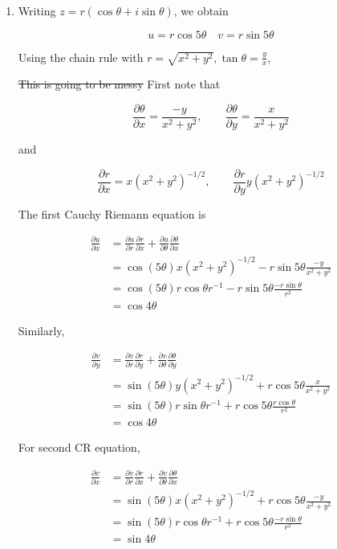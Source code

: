 \documentclass[a4paper]{article}
\begin{document}
\begin{enumerate}
	
	\item Writing $ z= r(\cos \theta + i \sin \theta) $, we obtain 
	
	\[ u = r\cos 5 \theta \quad v = r\sin 5\theta \]
	
	Using the chain rule with $ r = \sqrt{x^{2} + y^{2}}, \tan \theta = \frac{y}{x} $,
	
	\st{This is going to be messy} First note that
	
	\[ \frac{\partial \theta }{\partial x} = \frac{-y}{x^{2} + y^{2}}, \qquad \frac{\partial \theta }{\partial y} = \frac{x}{x^{2} + y^{2}} \]
	
	and
	
	\[ \frac{\partial r }{\partial x} = x (x^{2} + y^{2})^{-1/2}, \qquad \frac{\partial r }{\partial y} y (x^{2} + y^{2})^{-1/2} \]
	
	The first Cauchy Riemann equation is
	
	\begin{align*}
	\frac{\partial u }{\partial x} & = \frac{\partial u }{\partial r} \frac{\partial r}{\partial x} + \frac{\partial u }{\partial \theta} \frac{\partial \theta}{\partial x} \\
	& = \cos (5 \theta) x (x^{2} + y^{2})^{-1/2} - r \sin 5 \theta \frac{-y}{x^{2} + y^{2}} \\
	& = \cos (5 \theta) r \cos \theta r^{-1}  - r \sin 5 \theta \frac{-r \sin \theta }{r^{2}} \\
	& = \cos 4 \theta
	\end{align*}
	
	Similarly, 
	
	\begin{align*}
	\frac{\partial v }{\partial y} & = \frac{\partial v }{\partial r} \frac{\partial r}{\partial y} + \frac{\partial v }{\partial \theta} \frac{\partial \theta}{\partial y} \\
	& = \sin (5 \theta) y (x^{2} + y^{2})^{-1/2} + r \cos 5 \theta \frac{x}{x^{2} + y^{2}} \\
	& = \sin (5 \theta) r \sin \theta r^{-1} + r \cos 5 \theta \frac{r \cos \theta}{r^{2}} \\
	& = \cos 4 \theta
	\end{align*}
	
	For second CR equation,
	
	\begin{align*}
	\frac{\partial v }{\partial x} & = \frac{\partial v }{\partial r} \frac{\partial r}{\partial x} + \frac{\partial v }{\partial \theta} \frac{\partial \theta}{\partial x} \\
	& = \sin (5 \theta) x (x^{2} + y^{2})^{-1/2} + r \cos 5 \theta \frac{-y}{x^{2} + y^{2}} \\
	& = \sin (5 \theta) r \cos \theta r^{-1}  + r \cos 5 \theta \frac{-r \sin \theta }{r^{2}} \\
	& = \sin 4 \theta
	\end{align*}
	

\end{enumerate}
\end{document}
